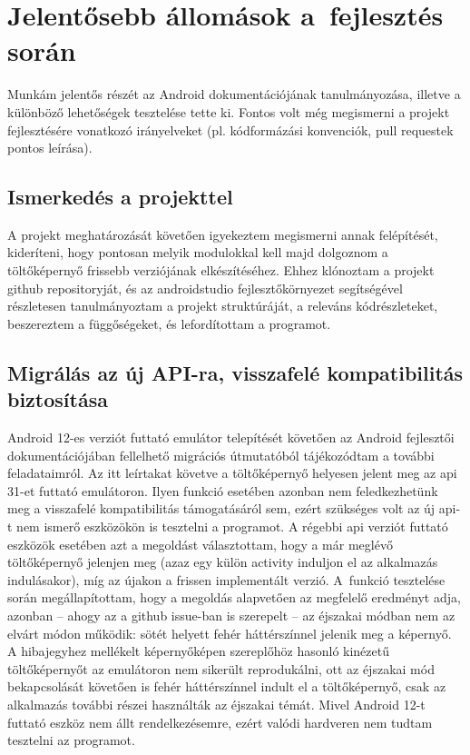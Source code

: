 \chapter{Jelentősebb állomások a~fejlesztés során}
Munkám jelentős részét az Android dokumentációjának tanulmányozása, illetve a különböző lehetőségek
tesztelése tette ki. Fontos volt még megismerni a projekt fejlesztésére vonatkozó irányelveket
(pl. kódformázási konvenciók, pull requestek pontos leírása).

\section{Ismerkedés a projekttel}
A projekt meghatározását követően igyekeztem megismerni annak felépítését, kideríteni, hogy
pontosan melyik modulokkal kell majd dolgoznom a töltőképernyő frissebb verziójának elkészítéséhez.
Ehhez klónoztam a projekt \gls{github} repositoryját, és az \gls{androidstudio} fejlesztőkörnyezet
segítségével részletesen tanulmányoztam a projekt struktúráját, a releváns kódrészleteket,
beszereztem a függőségeket, és lefordítottam a programot.

\section{Migrálás az új API-ra, visszafelé kompatibilitás biztosítása}
Android 12-es verziót futtató emulátor telepítését követően az Android fejlesztői
dokumentációjában fellelhető migrációs útmutatóból tájékozódtam a további feladataimról.
Az itt leírtakat követve a töltőképernyő helyesen jelent meg az \acrshort{api} 31-et futtató emulátoron.
Ilyen funkció esetében azonban nem feledkezhetünk meg a visszafelé kompatibilitás támogatásáról
sem, ezért szükséges volt az új \acrshort{api}-t nem ismerő eszközökön is tesztelni a programot.
A régebbi \acrshort{api} verziót futtató eszközök esetében azt a megoldást választottam, hogy a már meglévő
töltőképernyő jelenjen meg (azaz egy külön  \gls{activity} induljon el az alkalmazás
indulásakor), míg az újakon a frissen implementált verzió. A~funkció tesztelése során
megállapítottam, hogy a megoldás alapvetően az megfelelő eredményt adja, azonban -- ahogy az a
\gls{github} issue-ban \cite{issue} is szerepelt -- az éjszakai módban nem az elvárt módon működik: sötét helyett
fehér háttérszínnel jelenik meg a képernyő. A hibajegyhez mellékelt képernyőképen szereplőhöz
hasonló kinézetű töltőképernyőt az emulátoron nem sikerült reprodukálni, ott az éjszakai mód
bekapcsolását követően is fehér háttérszínnel indult el a töltőképernyő, csak az alkalmazás
további részei használták az éjszakai témát. Mivel Android 12-t futtató eszköz nem állt
rendelkezésemre, ezért valódi hardveren nem tudtam tesztelni az programot.

